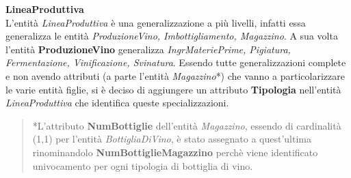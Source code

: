 \begin{flushleft}
	\textbf{\large{LineaProduttiva}}\\
	L'entità \emph{LineaProduttiva} è una generalizzazione a più livelli, infatti essa generalizza le entità \emph{ProduzioneVino, Imbottigliamento, Magazzino}. A sua volta l'entità \textbf{ProduzioneVino} generalizza \emph{IngrMateriePrime, Pigiatura, Fermentazione, Vinificazione, Svinatura}. Essendo tutte generalizzazioni complete e non avendo attributi (a parte l'entità \emph{Magazzino}*) che vanno a particolarizzare le varie entità figlie, si è deciso di aggiungere un attributo \textbf{Tipologia} nell'entità \emph{LineaProduttiva} che identifica queste specializzazioni.
\end{flushleft}

\begin{verse}
	*L'attributo \textbf{NumBottiglie} dell'entità \emph{Magazzino}, essendo di cardinalità (1,1) per l'entità \emph{BottigliaDiVino}, è stato assegnato a quest'ultima rinominandolo \textbf{NumBottiglieMagazzino} perchè viene identificato univocamento per ogni tipologia di bottiglia di vino.
\end{verse}